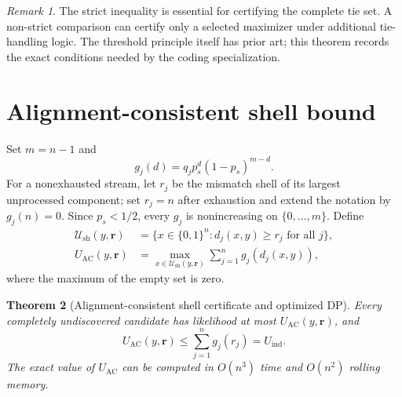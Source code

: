 \documentclass[11pt]{article}
\newtheorem{theorem}{Theorem}
\theoremstyle{remark}
\newtheorem{remark}[theorem]{Remark}
\begin{document}
\begin{remark}
The strict inequality is essential for certifying the complete tie set. A non-strict
comparison can certify only a selected maximizer under additional tie-handling logic.
The threshold principle itself has prior art; this theorem records the exact conditions
needed by the coding specialization.
\end{remark}


\section{Alignment-consistent shell bound}

Set $m=n-1$ and
\[
 g_j(d)=q_jp_s^d(1-p_s)^{m-d}.
\]
For a nonexhausted stream, let $r_j$ be the mismatch shell of its largest unprocessed
component; set $r_j=n$ after exhaustion and extend the notation by $g_j(n)=0$. Since
$p_s<1/2$, every $g_j$ is nonincreasing on $\{0,\ldots,m\}$.
Define
\begin{align*}
 \mathcal U_{\mathrm{sh}}(y,\mathbf r)
 &=\{x\in\{0,1\}^n:d_j(x,y)\ge r_j\text{ for all }j\},\\
 U_{\mathrm{AC}}(y,\mathbf r)
 &=\max_{x\in\mathcal U_{\mathrm{sh}}(y,\mathbf r)}
 \sum_{j=1}^{n}g_j(d_j(x,y)),
\end{align*}
where the maximum of the empty set is zero.

\begin{theorem}[Alignment-consistent shell certificate and optimized DP]
Every completely undiscovered candidate has likelihood at most
$U_{\mathrm{AC}}(y,\mathbf r)$, and
\[
 U_{\mathrm{AC}}(y,\mathbf r)
 \le\sum_{j=1}^{n}g_j(r_j)=U_{\mathrm{ind}}.
\]
The exact value of $U_{\mathrm{AC}}$ can be computed in $O(n^3)$ time and $O(n^2)$
rolling memory.
\end{theorem}
\end{document}
